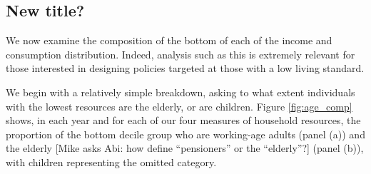 \subsection{New title?}

We now examine the composition of the bottom of each of the income and consumption distribution. Indeed, analysis such as this is extremely relevant for those interested in designing policies targeted at those with a low living standard.

We begin with a relatively simple breakdown, asking to what extent individuals with the lowest resources are the elderly, or are children. Figure \ref{fig:age_comp} shows, in each year and for each of our four measures of household resources, the proportion of the bottom decile group who are working-age adults (panel (a)) and the elderly [Mike asks Abi: how define ``pensioners'' or the ``elderly''?] (panel (b)), with children representing the omitted category.


